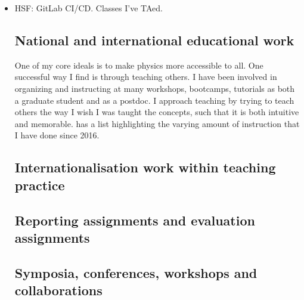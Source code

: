 \begin{itemize}
\item

HSF: GitLab CI/CD.
Classes I've TAed.

\subsection{National and international educational work \noneyet}\label{ssec:national-and-international-educational-work-noneyet}

One of my core ideals is to make physics more accessible to all. One successful way I find is through teaching others. I have been involved in organizing and instructing at many workshops, bootcamps, tutorials as both a graduate student and as a postdoc. I approach teaching by trying to teach others the way I wish I was taught the concepts, such that it is both intuitive and memorable.  has a list highlighting the varying amount of instruction that I have done since 2016.

\subsection{Internationalisation work within teaching practice \noneyet}\label{ssec:internationalisation-work-within-teaching-practice-noneyet}
\subsection{Reporting assignments and evaluation assignments \noneyet}\label{ssec:reporting-assignments-and-evaluation-assignments-noneyet}
\subsection{Symposia, conferences, workshops and collaborations}\label{ssec:symposia-conferences-workshops-and-collaborations}


\end{itemize}
